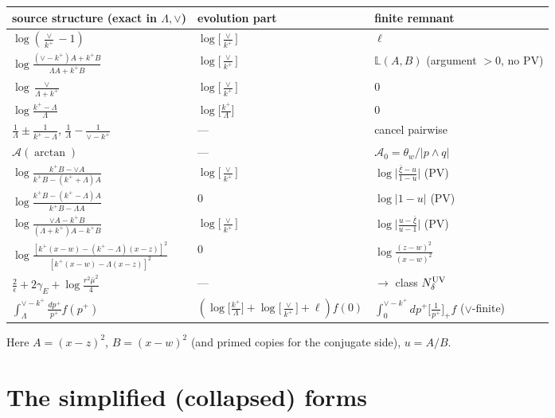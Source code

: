 \documentclass[11pt]{article}
\newcommand{\LB}{\log\!\big[\tfrac{\vee}{k^{+}}\big]}
\newcommand{\LJ}{\log\!\big[\tfrac{k^{+}}{\Lambda}\big]}
\newcommand{\xib}{\bar{\xi}}
\newcommand{\Azero}{\mathcal{A}_{0}}
\begin{document}
\begin{center}
\begin{tabular}{lll}
\toprule
source structure (exact in $\Lambda,\vee$) & evolution part & finite remnant \\
\midrule
$\log(\tfrac{\vee}{k^{+}}-1)$ & $\LB$ & $\ell$\\[2pt]
$\log\frac{(\vee-k^{+})A+k^{+}B}{\Lambda A+k^{+}B}$ & $\LB$ & $\mathbb L(A,B)$ \quad(argument $>0$, no PV)\\[2pt]
$\log\frac{\vee}{\Lambda+k^{+}}$ & $\LB$ & $0$\\[2pt]
$\log\frac{k^{+}-\Lambda}{\Lambda}$ & $\LJ$ & $0$\\[2pt]
$\frac1\Lambda\pm\frac{1}{k^{+}-\Lambda}$, $\frac1\Lambda-\frac{1}{\vee-k^{+}}$ & --- & cancel pairwise\\[2pt]
$\mathcal A(\arctan)$ & --- & $\Azero=\theta_{w}/|p\wedge q|$\\[2pt]
$\log\frac{k^{+}B-\vee A}{k^{+}B-(k^{+}+\Lambda)A}$ & $\LB$ & $\log\big|\frac{\xib-u}{1-u}\big|$ \;(PV)\\[2pt]
$\log\frac{k^{+}B-(k^{+}-\Lambda)A}{k^{+}B-\Lambda A}$ & $0$ & $\log|1-u|$ \;(PV)\\[2pt]
$\log\frac{\vee A-k^{+}B}{(\Lambda+k^{+})A-k^{+}B}$ & $\LB$ & $\log\big|\frac{u-\xib}{u-1}\big|$ \;(PV)\\[2pt]
$\log\frac{[k^{+}(x-w)-(k^{+}-\Lambda)(x-z)]^{2}}{[k^{+}(x-w)-\Lambda(x-z)]^{2}}$ & $0$ & $\log\frac{(z-w)^{2}}{(x-w)^{2}}$\\[2pt]
$\frac{2}{\epsilon}+2\gamma_{E}+\log\frac{r^{2}\bar\mu^{2}}{4}$ & --- & $\to$ class $N^{\rm UV}_{\delta}$\\[2pt]
$\int_{\Lambda}^{\vee-k^{+}}\!\frac{dp^{+}}{p^{+}}f(p^{+})$ & $(\LJ+\LB+\ell)f(0)$ & $\int_{0}^{\vee-k^{+}}\!dp^{+}\big[\tfrac1{p^{+}}\big]_{+}f$ \;($\vee$-finite)\\
\bottomrule
\end{tabular}
\end{center}
Here $A=(x-z)^{2}$, $B=(x-w)^{2}$ (and primed copies for the conjugate side), $u=A/B$.

\section{The simplified (collapsed) forms}
\end{document}

